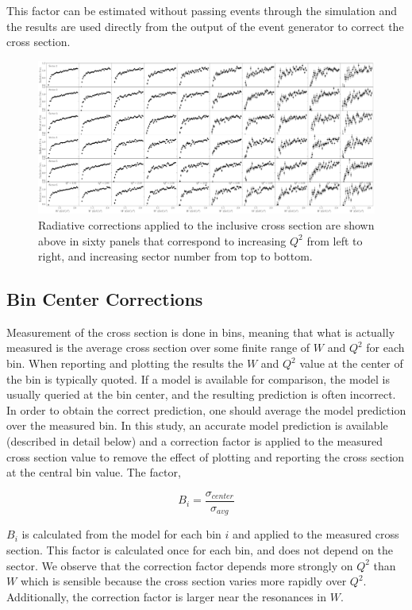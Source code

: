 This factor can be estimated without passing events through the simulation and the results are used directly from the output of the event generator to correct the cross section.  

\begin{figure}
	\centering
	\label{fig-rad-corr-grid} 
	\includegraphics[width=\textwidth]{image/plots/inclusive/rad_corr_grid.pdf}
	\caption{Radiative corrections applied to the inclusive cross section are shown above in sixty panels that correspond to increasing $Q^2$ from left to right, and increasing sector number from top to bottom.  }
\end{figure}

\subsection{Bin Center Corrections}
Measurement of the cross section is done in bins, meaning that what is actually measured is the average cross section over some finite range of $W$ and $Q^2$ for each bin.  When reporting and plotting the results the $W$ and $Q^2$ value at the center of the bin is typically quoted.  If a model is available for comparison, the model is usually queried at the bin center, and the resulting prediction is often incorrect.  In order to obtain the correct prediction, one should average the model prediction over the measured bin.  In this study, an accurate model prediction is available (described in detail below) and a correction factor is applied to the measured cross section value to remove the effect of plotting and reporting the cross section at the central bin value.  The factor, 

\begin{equation}
	B_{i} = \frac{\sigma_{center}}{\sigma_{avg}}
\end{equation}

$B_i$ is calculated from the model for each bin $i$ and applied to the measured cross section.  This factor is calculated once for each bin, and does not depend on the sector.  We observe that the correction factor depends more strongly on $Q^2$ than $W$ which is sensible because the cross section varies more rapidly over $Q^2$.  Additionally, the correction factor is larger near the resonances in $W$.

